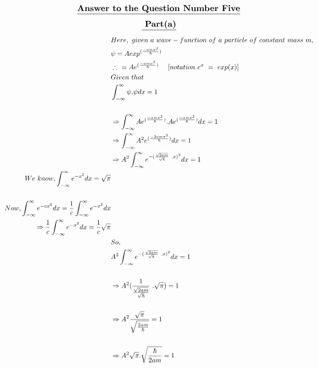 \documentclass{article}
\begin{document}
\begin{homeworkProblem}

    \[ \textbf{\underline {Answer to the Question Number Five}}
    \]
    \[
    \textbf{\underline{ Part(a)}}
    \]
\vspace{5mm}
\hspace{20mm}    
\begin{align*}
\large
   &Here,\ given\ a\ wave-function\ of\ a\ particle\ of\ constant\ mass\ m,\\
   & \psi = A exp^{( \frac{-amx^{2}}{\hbar})}\\
   &\therefore \ \ =A e^{( \frac{-amx^{2}}{\hbar})}\ \ \  \ [ notation \ e^{x} \ = \ exp(x)]\\
   &Given\ that\\
   \ \ &\int_{-\infty}^{\infty}\psi . \psi dx = 1\\\\
   &\Rightarrow \int_{-\infty}^{\infty}A e^{( \frac{-amx^{2}}{\hbar})} . A e^{( \frac{-amx^{2}}{\hbar})} dx = 1\\
   &\Rightarrow \int_{-\infty}^{\infty}A^{2} e^{(\frac{-2amx^{2}}{\hbar})} dx = 1\\
   &\Rightarrow A^{2} \int_{-\infty}^{\infty} e^{-(\frac{\sqrt {2am}}{\sqrt{\hbar}}\ .x)^{2}} dx = 1\\
   We\ know, \int_{-\infty}^{\infty} e^{-x^{2}} dx = \sqrt{\pi}\\\\
   Now, \int_{-\infty}^{\infty} e^{-cx^{2}} dx = \frac{1}{c} \int_{-\infty}^{\infty} e^{-x^{2}} dx\\ 
   \Rightarrow \frac{1}{c} \int_{-\infty}^{\infty} e^{-x^{2}} dx  =\frac{1}{c} \sqrt{\pi}\\
   &So,\\
   & A^{2} \int_{-\infty}^{\infty} e^{-(\frac{\sqrt {2am}}{\sqrt{\hbar}}\ .x)^{2}} dx = 1\\\\
   &\Rightarrow A^{2}({\frac{1}{\frac{\sqrt{2am}}{\sqrt{\hbar}}}\ . \sqrt{\pi}}) = 1\\\\
   &\Rightarrow A^{2}{\frac{\sqrt{\pi}}{\sqrt{\frac{2am}{\hbar}}}} =1\\\\
   &\Rightarrow A^{2}\sqrt{\pi}.{\sqrt{\frac{\hbar}{2am}}} =1\\\\
\end{align*}

\end{homeworkProblem}
\end{document}
